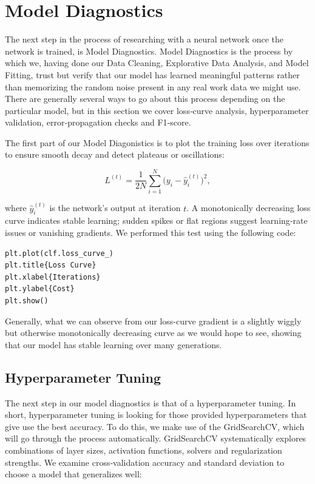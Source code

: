 \section{Model Diagnostics}

The next step in the process of researching with a neural network once the network is trained, is Model Diagnostics. 
Model Diagnostics is the process by which we, having done our Data Cleaning, Explorative Data Analysis, and Model Fitting, trust but verify that our model has learned meaningful patterns rather than memorizing the random noise present in any real work data we might use. 
There are generally several ways to go about this process depending on the particular model, but in this section we cover loss‐curve analysis, hyperparameter validation, error‐propagation checks and F1‐score.

The first part of our Model Diagonistics is to plot the training loss over iterations to ensure smooth decay and detect plateaus or oscillations:

\[
L^{(t)} = \frac{1}{2N}\sum_{i=1}^{N}\bigl(y_i - \hat y_i^{(t)}\bigr)^2,
\]

where \(\hat y_i^{(t)}\) is the network’s output at iteration \(t\). A monotonically decreasing loss curve indicates stable learning; sudden spikes or flat regions suggest learning‐rate issues or vanishing gradients.
We performed this test using the following code:

\begin{verbatim}
plt.plot(clf.loss_curve_)
plt.title{Loss Curve}
plt.xlabel{Iterations}
plt.ylabel{Cost}
plt.show()
\end{verbatim}

Generally, what we can observe from our loss-curve gradient is a slightly wiggly but otherwise monotonically decreasing curve as we would hope to see, showing that our model has stable learning over many generations.


\subsection{Hyperparameter Tuning}
The next step in our model diagnostics is that of a hyperparameter tuning. In short, hyperparameter tuning is looking for those provided hyperparameters that give use the best accuracy.
To do this, we make use of the GridSearchCV, which will go through the process automatically.
GridSearchCV systematically explores combinations of layer sizes, activation functions, solvers and regularization strengths. We examine cross‐validation accuracy and standard deviation to choose a model that generalizes well:

